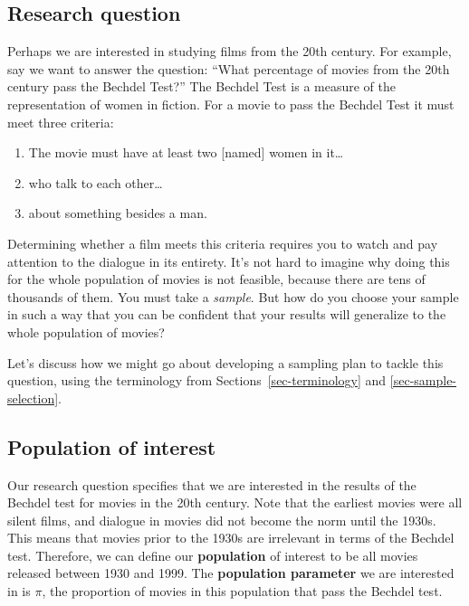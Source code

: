 \documentclass[
  letterpaper,
  DIV=11,
  numbers=noendperiod]{scrreprt}
\providecommand{\tightlist}{%
  \setlength{\itemsep}{0pt}\setlength{\parskip}{0pt}}\usepackage{longtable,booktabs,array}
\theoremstyle{definition}
\theoremstyle{remark}
\begin{document}
\hypertarget{research-question}{%
\subsection{Research question}\label{research-question}}

Perhaps we are interested in studying films from the 20th century. For
example, say we want to answer the question: ``What percentage of movies
from the 20th century pass the Bechdel Test?'' The Bechdel Test is a
measure of the representation of women in fiction. For a movie to pass
the Bechdel Test it must meet three criteria:

\begin{enumerate}
\def\labelenumi{\arabic{enumi}.}
\tightlist
\item
  The movie must have at least two {[}named{]} women in it\ldots{}
\item
  who talk to each other\ldots{}
\item
  about something besides a man.
\end{enumerate}

Determining whether a film meets this criteria requires you to watch and
pay attention to the dialogue in its entirety. It's not hard to imagine
why doing this for the whole population of movies is not feasible,
because there are tens of thousands of them. You must take a
\emph{sample}. But how do you choose your sample in such a way that you
can be confident that your results will generalize to the whole
population of movies?

Let's discuss how we might go about developing a sampling plan to tackle
this question, using the terminology from Sections~\ref{sec-terminology}
and \ref{sec-sample-selection}.

\hypertarget{population-of-interest}{%
\subsection{Population of interest}\label{population-of-interest}}

Our research question specifies that we are interested in the results of
the Bechdel test for movies in the 20th century. Note that the earliest
movies were all silent films, and dialogue in movies did not become the
norm until the 1930s. This means that movies prior to the 1930s are
irrelevant in terms of the Bechdel test. Therefore, we can define our
\textbf{population} of interest to be all movies released between 1930
and 1999. The \textbf{population parameter} we are interested in is
\(\pi\), the proportion of movies in this population that pass the
Bechdel test.
\end{document}
